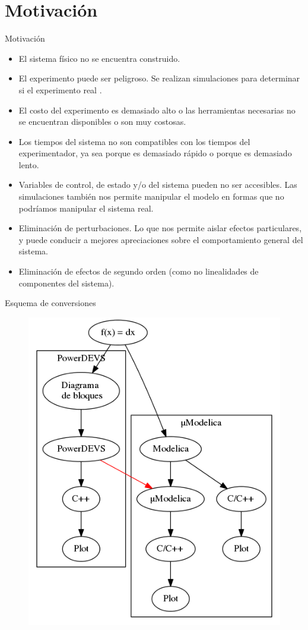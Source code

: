 \documentclass{beamer}
\begin{document}
\section{Motivación}
\begin{frame}{Motivación}
\begin{itemize}
	\item<1-> El sistema físico no se encuentra construido. 
	
	\item<2-> El experimento puede ser peligroso. Se realizan simulaciones para determinar si el experimento real .

	\item<3-> El costo del experimento es demasiado alto o las herramientas necesarias no se encuentran disponibles o son muy costosas.

	\item<4-> Los tiempos del sistema no son compatibles con los tiempos del experimentador, ya sea porque es demasiado rápido o porque es demasiado lento.

	\item<5-> Variables de control, de estado y/o del sistema pueden no ser accesibles. Las simulaciones también nos permite manipular el modelo en formas que no podríamos manipular el sistema real.

	\item<6-> Eliminación de perturbaciones. Lo que nos permite aislar efectos particulares, y puede conducir a mejores apreciaciones sobre el comportamiento general del sistema.

	\item<7-> Eliminación de efectos de segundo orden (como no linealidades de componentes del sistema). %
\end{itemize}
\end{frame}

\begin{frame}{Esquema de conversiones}
\begin{figure}[H]
\centering
 \includegraphics[width=0.55\linewidth]{esquema}
\end{figure}
\end{frame}
\end{document}
